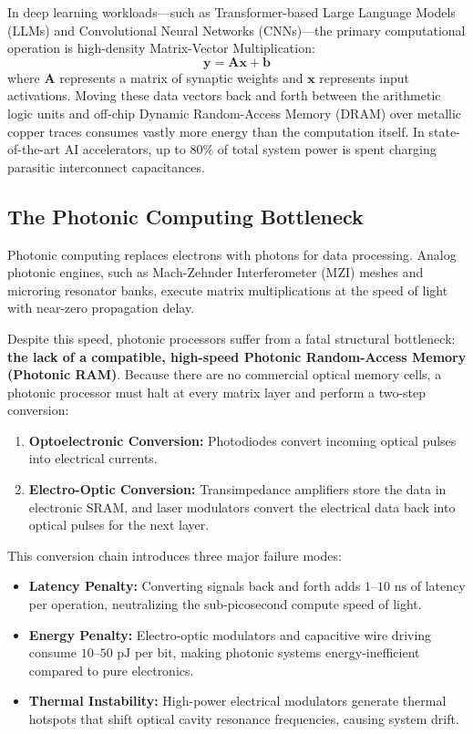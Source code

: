 \documentclass[11pt,a4paper]{article}
\begin{document}
In deep learning workloads---such as Transformer-based Large Language Models (LLMs) and Convolutional Neural Networks (CNNs)---the primary computational operation is high-density Matrix-Vector Multiplication:
\begin{equation}
\mathbf{y} = \mathbf{A} \mathbf{x} + \mathbf{b}
\end{equation}
where $\mathbf{A}$ represents a matrix of synaptic weights and $\mathbf{x}$ represents input activations. Moving these data vectors back and forth between the arithmetic logic units and off-chip Dynamic Random-Access Memory (DRAM) over metallic copper traces consumes vastly more energy than the computation itself. In state-of-the-art AI accelerators, up to $80\%$ of total system power is spent charging parasitic interconnect capacitances.

\subsection{The Photonic Computing Bottleneck}
Photonic computing replaces electrons with photons for data processing. Analog photonic engines, such as Mach-Zehnder Interferometer (MZI) meshes and microring resonator banks, execute matrix multiplications at the speed of light with near-zero propagation delay.

Despite this speed, photonic processors suffer from a fatal structural bottleneck: \textbf{the lack of a compatible, high-speed Photonic Random-Access Memory (Photonic RAM)}. Because there are no commercial optical memory cells, a photonic processor must halt at every matrix layer and perform a two-step conversion:
\begin{enumerate}
    \item \textbf{Optoelectronic Conversion:} Photodiodes convert incoming optical pulses into electrical currents.
    \item \textbf{Electro-Optic Conversion:} Transimpedance amplifiers store the data in electronic SRAM, and laser modulators convert the electrical data back into optical pulses for the next layer.
\end{enumerate}

This conversion chain introduces three major failure modes:
\begin{itemize}
    \item \textbf{Latency Penalty:} Converting signals back and forth adds $1\text{--}10\text{ ns}$ of latency per operation, neutralizing the sub-picosecond compute speed of light.
    \item \textbf{Energy Penalty:} Electro-optic modulators and capacitive wire driving consume $10\text{--}50\text{ pJ}$ per bit, making photonic systems energy-inefficient compared to pure electronics.
    \item \textbf{Thermal Instability:} High-power electrical modulators generate thermal hotspots that shift optical cavity resonance frequencies, causing system drift.
\end{itemize}
\end{document}
